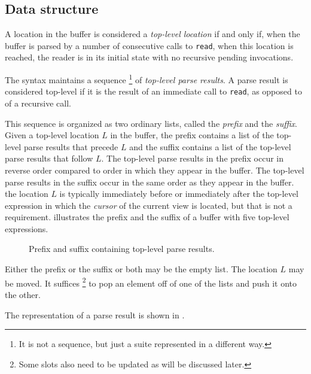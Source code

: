 \subsection{Data structure}
\label{sec-common-lisp-mode-syntax-data-structure}

A location in the buffer is considered a \emph{top-level location} if
and only if, when the buffer is parsed by a number of consecutive
calls to \texttt{read}, when this location is reached, the reader is
in its initial state with no recursive pending invocations.

The \commonlisp{} syntax maintains a sequence%
\footnote{It is not a \commonlisp{} sequence, but just a suite
  represented in a different way.}  of \emph{top-level parse results}.
A parse result is considered top-level if it is the result of an
immediate call to \texttt{read}, as opposed to of a recursive call.

This sequence is organized as two ordinary \commonlisp{} lists, called
the \emph{prefix} and the \emph{suffix}.  Given a top-level location
$L$ in the buffer, the prefix contains a list of the top-level parse
results that precede $L$ and the suffix contains a list of the
top-level parse results that follow $L$.  The top-level parse results
in the prefix occur in reverse order compared to order in which they
appear in the buffer.  The top-level parse results in the suffix occur
in the same order as they appear in the buffer.  the location $L$ is
typically immediately before or immediately after the top-level
expression in which the \emph{cursor} of the current view is located,
but that is not a requirement.  
illustrates the prefix and the suffix of a buffer with five top-level
expressions.

\begin{figure}
\begin{center}
\end{center}
\caption{\label{fig-cl-parser-prefix-suffix}
Prefix and suffix containing top-level parse results.}
\end{figure}

Either the prefix or the suffix or both may be the empty list.  The
location $L$ may be moved.  It suffices%
\footnote{Some slots also need to be updated as will be discussed later.}
to pop an element off of one
of the lists and push it onto the other.

The representation of a parse result is shown in
.

